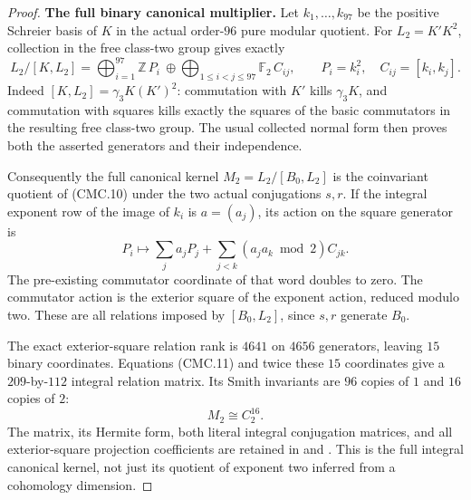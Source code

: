 \begin{proof}
\par\medskip\noindent\textbf{The full binary canonical multiplier.}
Let $k_1,\ldots,k_{97}$ be the positive Schreier basis of $K$ in the
actual order-$96$ pure modular quotient.  For $L_2=K'K^2$, collection in
the free class-two group gives exactly
\[
 L_2/[K,L_2]
   =\bigoplus_{i=1}^{97}\mathbb Z\,P_i
       \ \oplus\!
       \bigoplus_{1\leq i<j\leq97}\mathbb F_2\,C_{ij},
 \qquad P_i=k_i^2,\quad C_{ij}=[k_i,k_j].
 \tag{CMC.10}
\]
Indeed $[K,L_2]=\gamma_3K(K')^2$: commutation with $K'$ kills
$\gamma_3K$, and commutation with squares kills exactly the squares of
the basic commutators in the resulting free class-two group.  The usual
collected normal form then proves both the asserted generators and
their independence.

Consequently the full canonical kernel
$M_2=L_2/[B_0,L_2]$ is the coinvariant quotient of (CMC.10) under the
two actual conjugations $s,r$.  If the integral exponent row of the image
of $k_i$ is $a=(a_j)$, its action on the square generator is
\[
 P_i\longmapsto\sum_j a_jP_j+
                  \sum_{j<k}(a_ja_k\bmod2)C_{jk}.
 \tag{CMC.11}
\]
The pre-existing commutator coordinate of that word doubles to zero.
The commutator action is the exterior square of the exponent action,
reduced modulo two.  These are all relations imposed by $[B_0,L_2]$,
since $s,r$ generate $B_0$.

The exact exterior-square relation rank is $4641$ on $4656$ generators,
leaving $15$ binary coordinates.  Equations (CMC.11) and twice these
$15$ coordinates give a $209$-by-$112$ integral relation matrix.  Its
Smith invariants are $96$ copies of $1$ and $16$ copies of $2$:
\[
 M_2\cong C_2^{16}.
 \tag{CMC.12}
\]
The matrix, its Hermite form, both literal integral conjugation matrices,
and all exterior-square projection coefficients are retained in
 and
.  This is the full integral
canonical kernel, not just its quotient of exponent two inferred from
a cohomology dimension.


\end{proof}
